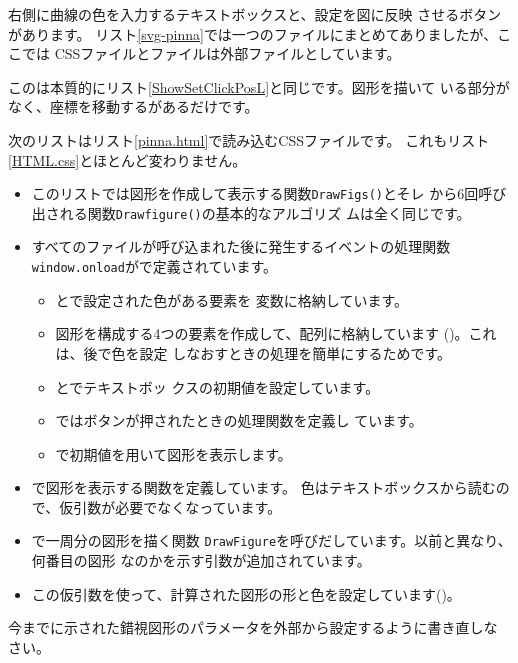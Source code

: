 右側に曲線の色を入力するテキストボックスと、設定を図に反映
させるボタンがあります。
リスト\ref{svg-pinna}では一つのファイルにまとめてありましたが、ここでは
CSSファイルと\JS ファイルは外部ファイルとしています。

この\HTML は本質的にリスト\ref{ShowSetClickPosL}と同じです。図形を描いて
いる部分がなく、座標を移動するがあるだけです。

次のリストはリスト\ref{pinna.html}で読み込むCSSファイルです。
これもリスト\ref{HTML.css}とほとんど変わりません。
\begin{itemize}
 \item このリストでは図形を作成して表示する関数\texttt{DrawFigs()}とそレ
       から6回呼び出される関数\texttt{Drawfigure()}の基本的なアルゴリズ
       ムは全く同じです。
 \item すべてのファイルが呼び込まれた後に発生するイベントの処理関数
       \texttt{window.onload}がで定義されています。
       \begin{itemize}
        \item {}とで設定された色がある要素を
              変数に格納しています。
        \item 図形を構成する4つの要素を作成して、配列に格納しています
              ()。これは、後で色を設定
              しなおすときの処理を簡単にするためです。
        \item {}とでテキストボッ
              クスの初期値を設定しています。
        \item {}ではボタンが押されたときの処理関数を定義し
              ています。
        \item {}で初期値を用いて図形を表示します。
       \end{itemize}
 \item {}で図形を表示する関数を定義しています。
       色はテキストボックスから読むので、仮引数が必要でなくなっています。
 \item {}で一周分の図形を描く関数
       \texttt{DrawFigure}を呼びだしています。以前と異なり、何番目の図形
       なのかを示す引数が追加されています。
 \item この仮引数を使って、計算された図形の形と色を設定しています()。
\end{itemize}
 \begin{Problem}
 今までに示された錯視図形のパラメータを外部から設定するように書き直しな
 さい。
 \end{Problem}